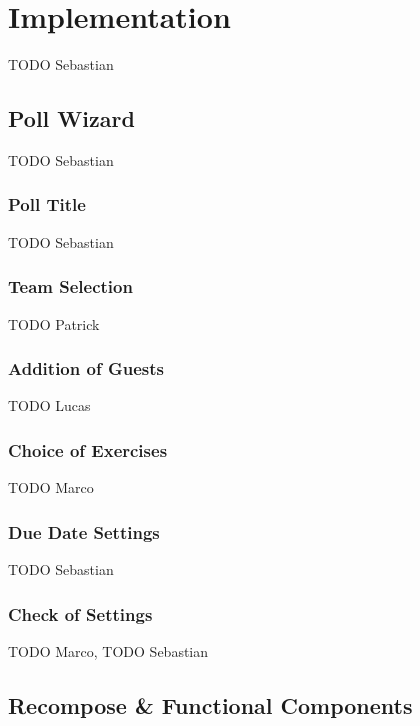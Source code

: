 \section{Implementation}
\label{sec:implementation}

TODO Sebastian

\subsection{Poll Wizard}
\label{ssec:poll_wizard}

TODO Sebastian

\subsubsection{Poll Title}
\label{sssec:poll_title}

TODO Sebastian

\subsubsection{Team Selection}
\label{sssec:poll_team}

TODO Patrick

\subsubsection{Addition of Guests}
\label{sssec:poll_guests}

TODO Lucas

\subsubsection{Choice of Exercises}
\label{sssec:poll_exercises}

TODO Marco

\subsubsection{Due Date Settings}
\label{sssec:poll_due_date}

TODO Sebastian

\subsubsection{Check of Settings}
\label{sssec:poll_check}

TODO Marco, TODO Sebastian

\subsection{Recompose \& Functional Components}
\label{ssec:recompose}

